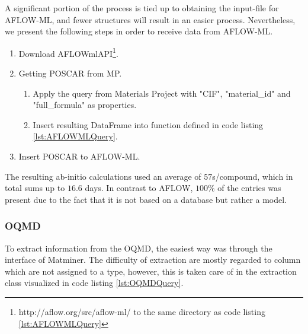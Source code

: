 A significant portion of the process is tied up to obtaining the input-file for AFLOW-ML, and fewer structures will result in an easier process. Nevertheless, we present the following steps in order to receive data from AFLOW-ML.

\begin{enumerate}
  \item Download AFLOWmlAPI\footnote{http://aflow.org/src/aflow-ml/ to the same directory as code listing \ref{lst:AFLOWMLQuery}}.
  \item Getting POSCAR from MP.
  \begin{enumerate}
    \item Apply the query from Materials Project with "CIF", "material\_id" and "full\_formula" as properties.
    \item Insert resulting DataFrame into function defined in code listing \ref{lst:AFLOWMLQuery}.
  \end{enumerate}
    \item Insert POSCAR to AFLOW-ML.
\end{enumerate}


The resulting ab-initio calculations used an average of $57$s/compound, which in total sums up to $16.6$ days. In contrast to AFLOW, $100\%$ of the entries was present due to the fact that it is not based on a database but rather a model.

\subsubsection{OQMD}

To extract information from the OQMD, the easiest way was through the interface of Matminer. The difficulty of extraction are mostly regarded to column which are not assigned to a type, however, this is taken care of in the extraction class visualized in code listing \ref{lst:OQMDQuery}.



